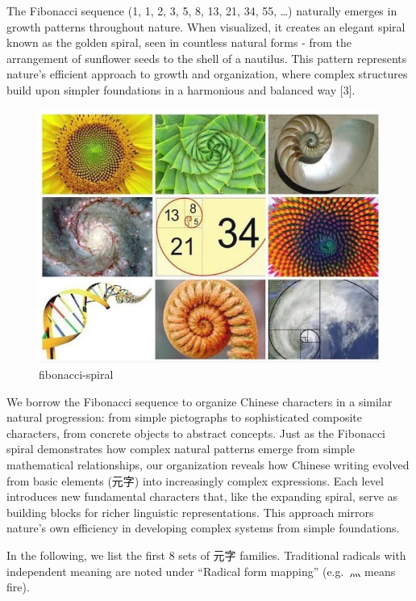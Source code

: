 \documentclass[
  11pt,
  letterpaper,
]{article}
\begin{document}
The Fibonacci sequence (1, 1, 2, 3, 5, 8, 13, 21, 34, 55, \ldots)
naturally emerges in growth patterns throughout nature. When visualized,
it creates an elegant spiral known as the golden spiral, seen in
countless natural forms - from the arrangement of sunflower seeds to the
shell of a nautilus. This pattern represents nature's efficient approach
to growth and organization, where complex structures build upon simpler
foundations in a harmonious and balanced way {[}3{]}.

\begin{figure}
\centering
\includegraphics{./images/fibonacci-spiral.png}
\caption{fibonacci-spiral}
\end{figure}

We borrow the Fibonacci sequence to organize Chinese characters in a
similar natural progression: from simple pictographs to sophisticated
composite characters, from concrete objects to abstract concepts. Just
as the Fibonacci spiral demonstrates how complex natural patterns emerge
from simple mathematical relationships, our organization reveals how
Chinese writing evolved from basic elements (元字) into increasingly
complex expressions. Each level introduces new fundamental characters
that, like the expanding spiral, serve as building blocks for richer
linguistic representations. This approach mirrors nature's own
efficiency in developing complex systems from simple foundations.

In the following, we list the first 8 sets of 元字 families. Traditional
radicals with independent meaning are noted under ``Radical form
mapping'' (e.g.~灬 means fire).
\end{document}
